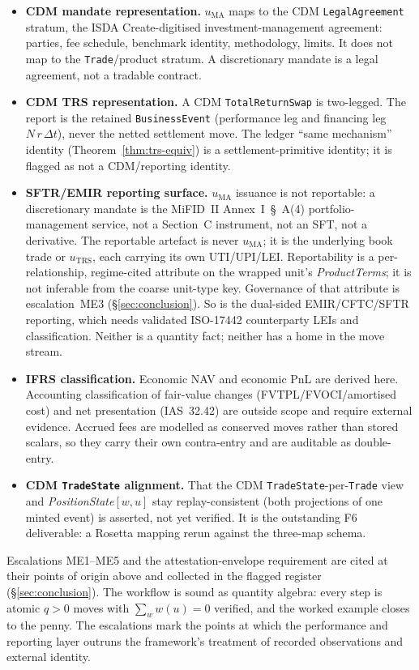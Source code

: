 \begin{itemize}[leftmargin=*]
\item \textbf{CDM mandate representation.} $u_{\mathrm{MA}}$ maps to the CDM
\texttt{LegalAgreement} stratum, the ISDA Create-digitised investment-management agreement:
parties, fee schedule, benchmark identity, methodology, limits. It does not map to the
\texttt{Trade}/product stratum. A discretionary mandate is a legal agreement, not a tradable
contract.
\item \textbf{CDM TRS representation.} A CDM \texttt{TotalReturnSwap} is two-legged. The
report is the retained \texttt{BusinessEvent} (performance leg and financing leg
$N\,r\,\Delta t$), never the netted settlement move. The ledger ``same mechanism'' identity
(Theorem~\ref{thm:trs-equiv}) is a settlement-primitive identity; it is flagged as not a
CDM/reporting identity.
\item \textbf{SFTR/EMIR reporting surface.} $u_{\mathrm{MA}}$ issuance is not reportable: a
discretionary mandate is the MiFID~II Annex~I~\S~A(4) portfolio-management service, not a Section~C
instrument, not an SFT, not a derivative.
The reportable artefact is never $u_{\mathrm{MA}}$; it is the underlying book trade or
$u_{\mathrm{TRS}}$, each carrying its own UTI/UPI/LEI. Reportability is a per-relationship,
regime-cited attribute on the wrapped unit's \textit{ProductTerms}; it is not inferable from
the coarse unit-type key. Governance of that attribute is escalation~ME3
(\S\ref{sec:conclusion}). So is the dual-sided EMIR/CFTC/SFTR reporting, which needs
validated ISO-17442 counterparty LEIs and classification. Neither is a quantity fact;
neither has a home in the move stream.
\item \textbf{IFRS classification.} Economic NAV and economic PnL are derived here.
Accounting classification of fair-value changes (FVTPL/FVOCI/amortised cost) and net
presentation (IAS~32.42) are outside scope and require external evidence. Accrued fees are
modelled as conserved moves rather than stored scalars, so they carry their own contra-entry
and are auditable as double-entry.
\item \textbf{CDM \texttt{TradeState} alignment.} That the CDM
\texttt{TradeState}-per-\texttt{Trade} view and \textit{PositionState}$[w,u]$ stay
replay-consistent (both projections of one minted event) is asserted, not yet verified. It
is the outstanding F6 deliverable: a Rosetta mapping rerun against the three-map schema.
\end{itemize}

Escalations ME1--ME5 and the attestation-envelope requirement are cited at their points of
origin above and collected in the flagged register (\S\ref{sec:conclusion}). The workflow is
sound as quantity algebra: every step is atomic $q>0$ moves with $\sum_w w(u)=0$ verified,
and the worked example closes to the penny. The escalations mark the points at which the
performance and reporting layer outruns the framework's treatment of recorded observations
and external identity.
